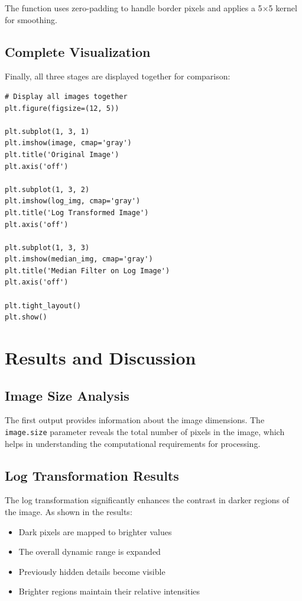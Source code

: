 \documentclass[12pt,a4paper]{article}
\begin{document}
The function uses zero-padding to handle border pixels and applies a 5$\times$5 kernel for smoothing.

\subsection{Complete Visualization}
Finally, all three stages are displayed together for comparison:

\begin{lstlisting}[caption={Complete Visualization}]
# Display all images together
plt.figure(figsize=(12, 5))

plt.subplot(1, 3, 1)
plt.imshow(image, cmap='gray')
plt.title('Original Image')
plt.axis('off')

plt.subplot(1, 3, 2)
plt.imshow(log_img, cmap='gray')
plt.title('Log Transformed Image')
plt.axis('off')

plt.subplot(1, 3, 3)
plt.imshow(median_img, cmap='gray')
plt.title('Median Filter on Log Image')
plt.axis('off')

plt.tight_layout()
plt.show()
\end{lstlisting}

\section{Results and Discussion}

\subsection{Image Size Analysis}
The first output provides information about the image dimensions. The \texttt{image.size} parameter reveals the total number of pixels in the image, which helps in understanding the computational requirements for processing.

\subsection{Log Transformation Results}
The log transformation significantly enhances the contrast in darker regions of the image. As shown in the results:

\begin{itemize}
    \item Dark pixels are mapped to brighter values
    \item The overall dynamic range is expanded
    \item Previously hidden details become visible
    \item Brighter regions maintain their relative intensities
\end{itemize}
\end{document}
